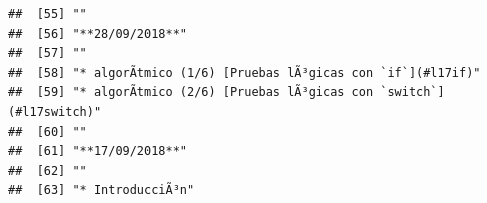 \documentclass[
]{book}
\begin{document}
\begin{verbatim}
##  [55] ""                                                                                                                                                                                                                                                                                                        
##  [56] "**28/09/2018**"                                                                                                                                                                                                                                                                                          
##  [57] ""                                                                                                                                                                                                                                                                                                        
##  [58] "* algorÃ­tmico (1/6) [Pruebas lÃ³gicas con `if`](#l17if)"                                                                                                                                                                                                                                                
##  [59] "* algorÃ­tmico (2/6) [Pruebas lÃ³gicas con `switch`](#l17switch)"                                                                                                                                                                                                                                        
##  [60] ""                                                                                                                                                                                                                                                                                                        
##  [61] "**17/09/2018**"                                                                                                                                                                                                                                                                                          
##  [62] ""                                                                                                                                                                                                                                                                                                        
##  [63] "* IntroducciÃ³n"                                                                                                                                                                                                                                                                                         

\end{verbatim}
\end{document}
